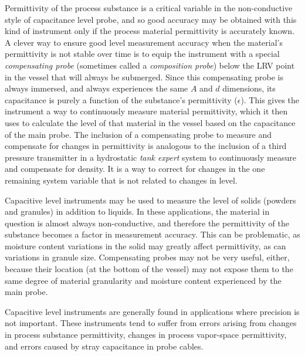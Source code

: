 Permittivity of the process substance is a critical variable in the non-conductive style of capacitance level probe, and so good accuracy may be obtained with this kind of instrument only if the process material permittivity is accurately known.  A clever way to ensure good level measurement accuracy when the material's permittivity is not stable over time is to equip the instrument with a special \textit{compensating probe} (sometimes called a \textit{composition probe}) below the LRV point in the vessel that will always be submerged.  Since this compensating probe is always immersed, and always experiences the same $A$ and $d$ dimensions, its capacitance is purely a function of the substance's permittivity ($\epsilon$).  This gives the instrument a way to continuously measure material permittivity, which it then uses to calculate the level of that material in the vessel based on the capacitance of the main probe.  The inclusion of a compensating probe to measure and compensate for changes in permittivity is analogous to the inclusion of a third pressure transmitter in a hydrostatic \textit{tank expert} system to continuously measure and compensate for density.  It is a way to correct for changes in the one remaining system variable that is not related to changes in level.    

\vskip 10pt

Capacitive level instruments may be used to measure the level of solids (powders and granules) in addition to liquids.  In these applications, the material in question is almost always non-conductive, and therefore the permittivity of the substance becomes a factor in measurement accuracy.  This can be problematic, as moisture content variations in the solid may greatly affect permittivity, as can variations in granule size.  Compensating probes may not be very useful, either, because their location (at the bottom of the vessel) may not expose them to the same degree of material granularity and moisture content experienced by the main probe.

Capacitive level instruments are generally found in applications where precision is not important.  These instruments tend to suffer from errors arising from changes in process substance permittivity, changes in process vapor-space permittivity, and errors caused by stray capacitance in probe cables.







